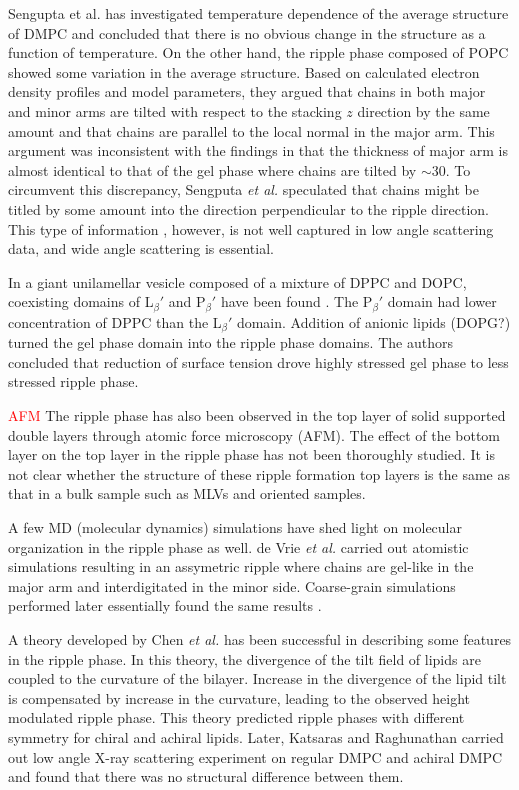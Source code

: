 Sengupta et al. \cite{ref:Sengupta03} has investigated temperature dependence of the average structure
of DMPC and concluded that there is no obvious change in the structure
as a function of temperature. On the other hand, the ripple phase composed of 
POPC showed some variation in the average structure.
Based on calculated electron density profiles and model parameters, they
argued that chains in both major and minor arms are tilted with respect to 
the stacking $z$ direction by the same amount and that 
chains are parallel to the local normal in the major arm. This argument 
was inconsistent with the findings in \cite{ref:Sun96} that
the thickness of major arm is almost identical to that of the gel phase where chains 
are tilted by $\sim$30\textdegree. To circumvent this discrepancy, 
Sengputa \textit{et al.} speculated that chains might be titled by some amount into the 
direction perpendicular to the ripple direction. This type of information
, however, is not well captured in low angle scattering data, and
wide angle scattering is essential.

In a giant unilamellar vesicle composed of a mixture of DPPC and DOPC, 
coexisting domains of L$_\beta'$ and P$_\beta'$ have been found \cite{ref:Li06}.
The P$_\beta'$ domain had lower concentration of DPPC than the L$_\beta'$
domain. Addition of anionic lipids (DOPG?) turned the gel phase domain
into the ripple phase domains. The authors concluded that reduction of 
surface tension drove highly stressed gel phase to less stressed ripple phase.

\textcolor{red}{AFM}
The ripple phase has also been observed in the top layer of 
solid supported double layers through atomic force microscopy (AFM).
The effect of the bottom layer on the top layer in the ripple phase has not been
thoroughly studied. 
It is not clear whether the structure of these ripple formation top layers
is the same as that in a bulk sample such as MLVs and oriented samples.

A few MD (molecular dynamics) simulations have shed light on molecular 
organization in the ripple phase as well. 
de Vrie \textit{et al.} \cite{ref:deVries05}
carried out atomistic simulations resulting in an
assymetric ripple where chains are gel-like in the major arm and
interdigitated in the minor side. Coarse-grain
simulations performed later essentially found the same results
\cite{ref:Lenz07}.

A theory developed by Chen \textit{et al.} \cite{ref:Chen95} has been 
successful in describing some features in the ripple phase. In this theory,
the divergence of the tilt field of lipids are coupled to the curvature 
of the bilayer. Increase in the divergence of the lipid tilt is compensated 
by increase in the curvature, leading to the observed height modulated
ripple phase. This theory predicted ripple phases with different symmetry
for chiral and achiral lipids. Later, Katsaras and Raghunathan 
\cite{ref:Katsaras95} carried out low angle X-ray scattering experiment
on regular DMPC and achiral DMPC and found that there was no structural
difference between them. 

